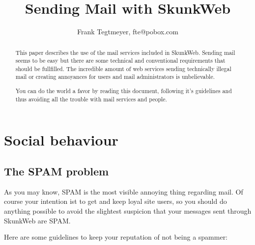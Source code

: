 \documentclass{article}
\author{Frank Tegtmeyer, fte@pobox.com}
\title{Sending Mail with SkunkWeb}
\begin{document}
\maketitle

\begin{abstract}
This paper describes the use of the mail services included in SkunkWeb.
Sending mail seems to be easy but there are some technical and conventional
requirements that should be fullfilled. The incredible amount of web services
sending technically illegal mail or creating annoyances for users and mail
administrators is unbelievable.

You can do the world a favor by reading this document, following it's
guidelines and thus avoiding all the trouble with mail services and
people.
\end{abstract}

\newpage
\tableofcontents
\newpage


\section{Social behaviour}

\subsection{The SPAM problem}

As you may know, SPAM is the most visible annoying thing regarding mail.
Of course your intention ist to get and keep loyal site users, so you
should do anything possible to avoid the slightest suspicion that your
messages sent through SkunkWeb are SPAM.

Here are some guidelines to keep your reputation of not being a spammer:
\end{document}
